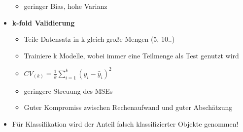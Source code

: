 \documentclass[a4paper]{article}
\begin{document}
\begin{landscape}
\begin{multicols}{3}
\begin{itemize}[noitemsep,nolistsep,leftmargin=*]
\begin{itemize}[noitemsep,nolistsep,leftmargin=*]
                \item geringer Bias, hohe Varianz
            \end{itemize}
            \item \textbf{k-fold Validierung}
            \begin{itemize}[noitemsep,nolistsep,leftmargin=*]
                \item Teile Datensatz in k gleich große Mengen (5, 10..)
                \item Trainiere k Modelle, wobei immer eine Teilmenge als Test genutzt wird
                \item $CV_{(k)} = \frac{1}{k}\sum_{i=1}^k (y_i - \hat{y}_i)^2$
                \item geringere Streuung des MSEs
                \item Guter Kompromiss zwischen Rechenaufwand und guter Abschätzung
            \end{itemize}
            \item Für Klassifikation wird der Anteil falsch klassifizierter Objekte genommen!
        \end{itemize}




\end{multicols}
\end{landscape}
\end{document}
